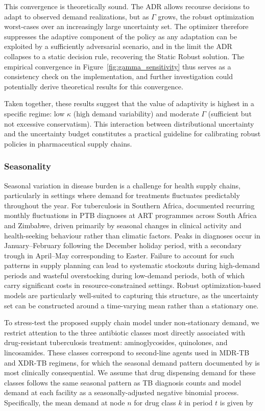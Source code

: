 \documentclass{article}
\begin{document}
This convergence is theoretically sound. The ADR allows recourse decisions to adapt to observed demand realizations, but as $\Gamma$ grows, the robust optimization worst-cases over an increasingly large uncertainty set. The optimizer therefore suppresses the adaptive component of the policy as any adaptation can be exploited by a sufficiently adversarial scenario, and in the limit the ADR collapses to a static decision rule, recovering the Static Robust solution. The empirical convergence in Figure~\ref{fig:gamma_sensitivity} thus serves as a consistency check on the implementation, and further investigation could potentially derive theoretical results for this convergence.

Taken together, these results suggest that the value of adaptivity is highest in a specific regime: low $\kappa$ (high demand variability) and moderate $\Gamma$ (sufficient but not excessive conservatism). This interaction between distributional uncertainty and the uncertainty budget constitutes a practical guideline for calibrating robust policies in pharmaceutical supply chains.

\subsubsection{Seasonality}

Seasonal variation in disease burden is a challenge for health supply chains, particularly in settings where demand for treatments fluctuates predictably throughout the year. For tuberculosis in Southern Africa, \cite{ballif2018} documented recurring monthly fluctuations in PTB diagnoses at ART programmes across South Africa and Zimbabwe, driven primarily by seasonal changes in clinical activity and health-seeking behaviour rather than climatic factors. Peaks in diagnoses occur in January--February following the December holiday period, with a secondary trough in April--May corresponding to Easter. Failure to account for such patterns in supply planning can lead to systematic stockouts during high-demand periods and wasteful overstocking during low-demand periods, both of which carry significant costs in resource-constrained settings. Robust optimization-based models are particularly well-suited to capturing this structure, as the uncertainty set can be constructed around a time-varying mean rather than a stationary one.

To stress-test the proposed supply chain model under non-stationary demand, we restrict attention to the three antibiotic classes most directly associated with drug-resistant tuberculosis treatment: aminoglycosides, quinolones, and lincosamides. These classes correspond to second-line agents used in MDR-TB and XDR-TB regimens, for which the seasonal demand pattern documented by \cite{ballif2018} is most clinically consequential. We assume that drug dispensing demand for these classes follows the same seasonal pattern as TB diagnosis counts and model demand at each facility as a seasonally-adjusted negative binomial process. Specifically, the mean demand at node $n$ for drug class $k$ in period $t$ is given by
\end{document}
